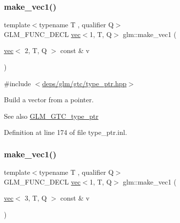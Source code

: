 \subsubsection{\texorpdfstring{make\+\_\+vec1()}{make\_vec1()}\hspace{0.1cm}{\footnotesize\ttfamily [2/4]}}
{\footnotesize\ttfamily template$<$typename T , qualifier Q$>$ \\
G\+L\+M\+\_\+\+F\+U\+N\+C\+\_\+\+D\+E\+CL \hyperlink{structglm_1_1vec}{vec}$<$1, T, Q$>$ glm\+::make\+\_\+vec1 (\begin{DoxyParamCaption}\item[{\hyperlink{structglm_1_1vec}{vec}$<$ 2, T, Q $>$ const \&}]{v }\end{DoxyParamCaption})\hspace{0.3cm}{\ttfamily [inline]}}



{\ttfamily \#include $<$\hyperlink{type__ptr_8hpp}{deps/glm/gtc/type\+\_\+ptr.\+hpp}$>$}

Build a vector from a pointer. \begin{DoxySeeAlso}{See also}
\hyperlink{group__gtc__type__ptr}{G\+L\+M\+\_\+\+G\+T\+C\+\_\+type\+\_\+ptr} 
\end{DoxySeeAlso}


Definition at line 174 of file type\+\_\+ptr.\+inl.

\mbox{\label{group__gtc__type__ptr_ga3c23cc74086d361e22bbd5e91a334e03}} 
\subsubsection{\texorpdfstring{make\+\_\+vec1()}{make\_vec1()}\hspace{0.1cm}{\footnotesize\ttfamily [3/4]}}
{\footnotesize\ttfamily template$<$typename T , qualifier Q$>$ \\
G\+L\+M\+\_\+\+F\+U\+N\+C\+\_\+\+D\+E\+CL \hyperlink{structglm_1_1vec}{vec}$<$1, T, Q$>$ glm\+::make\+\_\+vec1 (\begin{DoxyParamCaption}\item[{\hyperlink{structglm_1_1vec}{vec}$<$ 3, T, Q $>$ const \&}]{v }\end{DoxyParamCaption})\hspace{0.3cm}{\ttfamily [inline]}}



